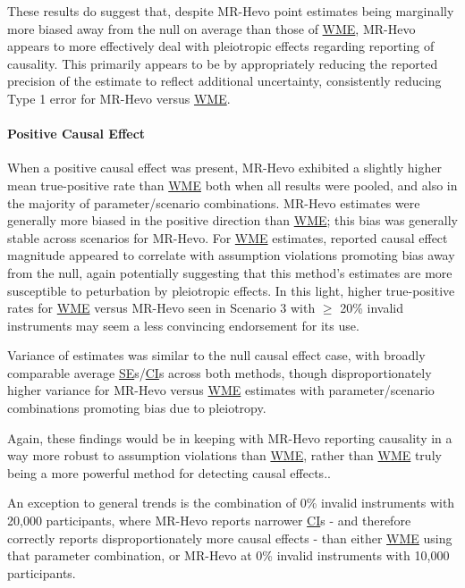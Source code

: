 \documentclass[
]{article}
\begin{document}
These results do suggest that, despite MR-Hevo point estimates being marginally more biased away from the null on average than those of \hyperref[acronyms_WME]{WME}, MR-Hevo appears to more effectively deal with pleiotropic effects regarding reporting of causality. This primarily appears to be by appropriately reducing the reported precision of the estimate to reflect additional uncertainty, consistently reducing Type 1 error for MR-Hevo versus \hyperref[acronyms_WME]{WME}.

\paragraph{Positive Causal Effect}\label{positive-causal-effect}

\leavevmode\newline When a positive causal effect was present, MR-Hevo exhibited a slightly higher mean true-positive rate than \hyperref[acronyms_WME]{WME} both when all results were pooled, and also in the majority of parameter/scenario combinations. MR-Hevo estimates were generally more biased in the positive direction than \hyperref[acronyms_WME]{WME}; this bias was generally stable across scenarios for MR-Hevo. For \hyperref[acronyms_WME]{WME} estimates, reported causal effect magnitude appeared to correlate with assumption violations promoting bias away from the null, again potentially suggesting that this method's estimates are more susceptible to peturbation by pleiotropic effects. In this light, higher true-positive rates for \hyperref[acronyms_WME]{WME} versus MR-Hevo seen in Scenario 3 with \(\ge\) 20\% invalid instruments may seem a less convincing endorsement for its use.

Variance of estimates was similar to the null causal effect case, with broadly comparable average \hyperref[acronyms_SE]{SE}s/\hyperref[acronyms_CI]{CI}s across both methods, though disproportionately higher variance for MR-Hevo versus \hyperref[acronyms_WME]{WME} estimates with parameter/scenario combinations promoting bias due to pleiotropy.

Again, these findings would be in keeping with MR-Hevo reporting causality in a way more robust to assumption violations than \hyperref[acronyms_WME]{WME}, rather than \hyperref[acronyms_WME]{WME} truly being a more powerful method for detecting causal effects..

An exception to general trends is the combination of 0\% invalid instruments with 20,000 participants, where MR-Hevo reports narrower \hyperref[acronyms_CI]{CI}s - and therefore correctly reports disproportionately more causal effects - than either \hyperref[acronyms_WME]{WME} using that parameter combination, or MR-Hevo at 0\% invalid instruments with 10,000 participants.
\end{document}
